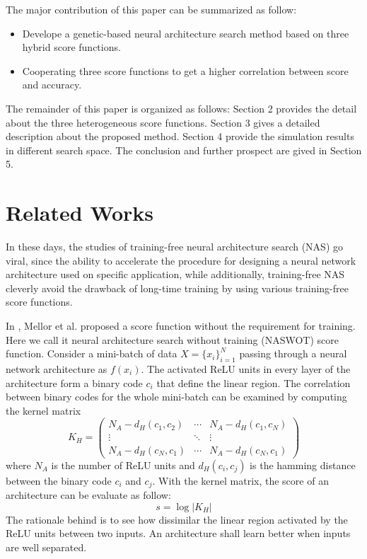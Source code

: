 \documentclass[sigconf]{acmart}
\begin{document}
    The major contribution of this paper can be summarized as follow:
    \begin{itemize}
        \item Develope a genetic-based neural architecture search method based on three hybrid score functions.
        \item Cooperating three score functions to get a higher correlation between score and accuracy.
    \end{itemize}

    The remainder of this paper is organized as follows: Section 2 provides the 
    detail about the three heterogeneous score functions. Section 3 gives a detailed 
    description about the proposed method. Section 4 provide the simulation results 
    in different search space. The conclusion and further prospect are gived in 
    Section 5.

    \section{Related Works}
    In these days, the studies of training-free neural architecture search (NAS) 
    go viral, since the ability to accelerate the procedure for designing a neural 
    network architecture used on specific application, while additionally, 
    training-free NAS cleverly avoid the drawback of long-time training by using 
    various training-free score functions. 

    In \cite{https://doi.org/10.48550/arxiv.2006.04647}, Mellor et al. proposed a 
    score function without the requirement for training. Here we call it neural 
    architecture search without training (NASWOT) score function. 
    Consider a mini-batch of data $X=\{x_i\}^N_{i=1}$ passing through a neural network 
    architecture as $f(x_i)$. The activated ReLU units in every layer of the architecture 
    form a binary code $c_i$ that define the linear region.
    The correlation between binary codes for the whole mini-batch can be examined 
    by computing the kernel matrix
    \begin{equation}
        K_H=\begin{pmatrix}N_A-d_H(c_1,c_2)&\cdots&N_A-d_H(c_1,c_N)\\\vdots&\ddots&\vdots\\N_A-d_H(c_N,c_1)&\cdots&N_A-d_H(c_N,c_1)\end{pmatrix}
    \end{equation}
    where $N_A$ is the number of ReLU units and $d_H(c_i,c_j)$ is the hamming 
    distance between the binary code $c_i$ and $c_j$. 
    With the kernel matrix, the score of an architecture can be evaluate as 
    follow: 
    \begin{equation}
        s=\log\lvert K_H\rvert
    \end{equation}
    The rationale behind is to see how dissimilar the linear region activated by 
    the ReLU units between two inputs. An architecture shall learn better 
    when inputs are well separated.
	
\end{document}
